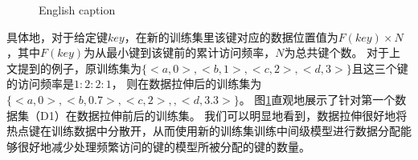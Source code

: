 
\begin{figure}[!htp]
  \centering
    {English caption}
  \label{fig:stretch}
\end{figure}

具体地，对于给定键$key$，在新的训练集里该键对应的数据位置值为$F(key) \times N$，其中$F(key)$为从最小键到该键前的累计访问频率，$N$为总共键个数。
对于上文提到的例子，原训练集为$\{<a, 0>, <b, 1>, <c, 2>, <d, 3>\}$且这三个键的访问频率是$1:2:2:1$，
则在数据拉伸后的训练集为$\{<a, 0>, <b, 0.7>, <c, 2>, , <d, 3.3>\}$。
图\ref{fig:stretch}直观地展示了针对第一个数据集（D1）在数据拉伸前后的训练集。
我们可以明显地看到，数据拉伸很好地将热点键在训练数据中分散开，从而使用新的训练集训练中间级模型进行数据分配能够很好地减少处理频繁访问的键的模型所被分配的键的数量。


